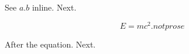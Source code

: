 See $a. b$ inline. Next.

\begin{equation}
E = mc^2. not prose
\end{equation}

After the equation. Next.
